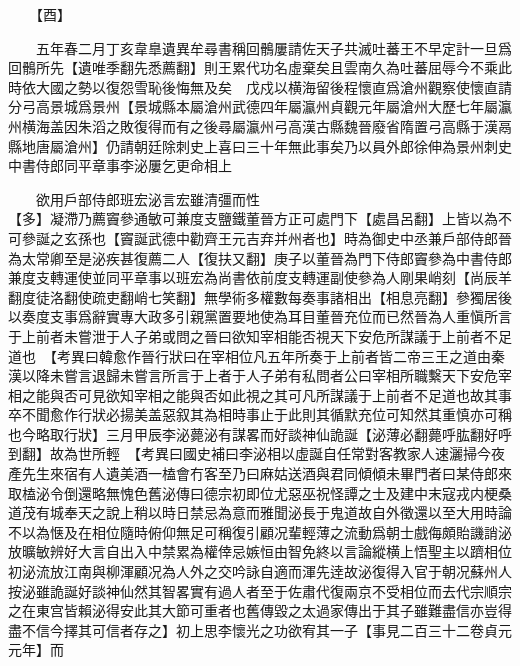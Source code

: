 　　【酉】

　　五年春二月丁亥韋臯遺異牟尋書稱回鶻屢請佐天子共滅吐蕃王不早定計一旦爲回鶻所先【遺唯季翻先悉薦翻】則王累代功名虛棄矣且雲南久為吐蕃屈辱今不乘此時依大國之勢以復怨雪恥後悔無及矣　戊戍以横海留後程懷直爲滄州觀察使懷直請分弓高景城爲景州【景城縣本屬滄州武德四年屬瀛州貞觀元年屬滄州大歷七年屬瀛州横海盖因朱滔之敗復得而有之後尋屬瀛州弓高漢古縣魏晉廢省隋置弓高縣于漢鬲縣地唐屬滄州】仍請朝廷除刺史上喜曰三十年無此事矣乃以員外郎徐伸為景州刺史　中書侍郎同平章事李泌屢乞更命相上

　　欲用戶部侍郎班宏泌言宏雖清彊而性　　　　　　　　　　　　　　　　　　　　【多】凝滯乃薦竇參通敏可兼度支鹽鐵董晉方正可處門下【處昌呂翻】上皆以為不可參誕之玄孫也【竇誕武德中勸齊王元吉弃并州者也】時為御史中丞兼戶部侍郎晉為太常卿至是泌疾甚復薦二人【復扶又翻】庚子以董晉為門下侍郎竇參為中書侍郎兼度支轉運使並同平章事以班宏為尚書依前度支轉運副使參為人剛果峭刻【尚辰羊翻度徒洛翻使疏吏翻峭七笑翻】無學術多權數每奏事諸相出【相息亮翻】參獨居後以奏度支事爲辭實專大政多引親黨置要地使為耳目董晉充位而已然晉為人重愼所言于上前者未嘗泄于人子弟或問之晉曰欲知宰相能否視天下安危所謀議于上前者不足道也　【考異曰韓愈作晉行狀曰在宰相位凡五年所奏于上前者皆二帝三王之道由秦漢以降未嘗言退歸未嘗言所言于上者于人子弟有私問者公曰宰相所職繫天下安危宰相之能與否可見欲知宰相之能與否如此視之其可凡所謀議于上前者不足道也故其事卒不聞愈作行狀必揚美盖惡叙其為相時事止于此則其循默充位可知然其重慎亦可稱也今略取行狀】三月甲辰李泌薨泌有謀畧而好談神仙詭誕【泌薄必翻薨呼肱翻好呼到翻】故為世所輕　【考異曰國史補曰李泌相以虛誕自任常對客教家人速灑掃今夜產先生來宿有人遺美酒一榼會冇客至乃曰麻姑送酒與君同傾傾未畢門者曰某侍郎來取榼泌令倒還略無愧色舊泌傳曰德宗初即位尤惡巫祝怪譚之士及建中末寇戎内梗桑道茂有城奉天之說上稍以時日禁忌為意而雅聞泌長于鬼道故自外徵還以至大用時論不以為惬及在相位隨時俯仰無足可稱復引顧况輩輕薄之流動爲朝士戲侮頗貽譏誚泌放曠敏辨好大言自出入中禁累為權倖忌嫉恒由智免終以言論縱横上悟聖主以躋相位初泌流放江南與柳渾顧况為人外之交吟詠自適而渾先逹故泌復得入官于朝况蘇州人按泌雖詭誕好談神仙然其智畧實有過人者至于佐肅代復兩京不受相位而去代宗順宗之在東宫皆賴泌得安此其大節可重者也舊傳毀之太過家傳出于其子雖難盡信亦豈得盡不信今擇其可信者存之】初上思李懷光之功欲宥其一子【事見二百三十二卷貞元元年】而

